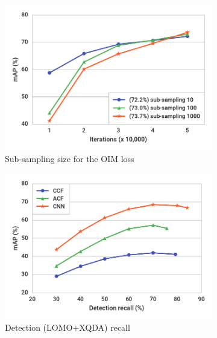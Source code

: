 \begin{figure}[t]
\begin{center}
\begin{subfigure}[t]{0.6\linewidth}
  \includegraphics[width=\linewidth]{figures/person_search/subsampling.pdf}
  \caption{Sub-sampling size for the OIM loss}
  \label{fig:subsampling}
\end{subfigure}
\begin{subfigure}[t]{0.6\linewidth}
  \includegraphics[width=\linewidth]{figures/person_search/factor-recall.pdf}
  \caption{Detection (LOMO+XQDA) recall}
  \label{fig:factor-recall}
\end{subfigure}
\begin{subfigure}[t]{0.6\linewidth}

\end{subfigure}
\end{center}
\end{figure}
